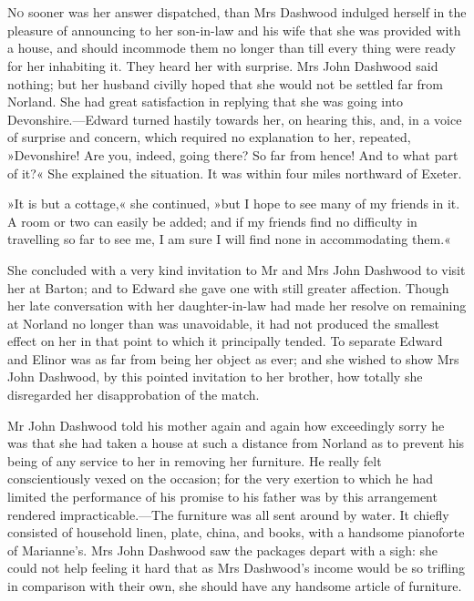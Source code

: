 \chapter[Chapter \thechapter]{}
\lettrine[lines=4,lraise=0.3]{N}{o} sooner was her answer dispatched, than Mrs Dashwood indulged herself in the pleasure of announcing to her son-in-law and his wife that she was provided with a house, and should incommode them no longer than till every thing were ready for her inhabiting it. They heard her with surprise. Mrs John Dashwood said nothing; but her husband civilly hoped that she would not be settled far from Norland. She had great satisfaction in replying that she was going into Devonshire.—Edward turned hastily towards her, on hearing this, and, in a voice of surprise and concern, which required no explanation to her, repeated, »Devonshire! Are you, indeed, going there? So far from hence! And to what part of it?« She explained the situation. It was within four miles northward of Exeter.

»It is but a cottage,« she continued, »but I hope to see many of my friends in it. A room or two can easily be added; and if my friends find no difficulty in travelling so far to see me, I am sure I will find none in accommodating them.«

She concluded with a very kind invitation to Mr and Mrs John Dashwood to visit her at Barton; and to Edward she gave one with still greater affection. Though her late conversation with her daughter-in-law had made her resolve on remaining at Norland no longer than was unavoidable, it had not produced the smallest effect on her in that point to which it principally tended. To separate Edward and Elinor was as far from being her object as ever; and she wished to show Mrs John Dashwood, by this pointed invitation to her brother, how totally she disregarded her disapprobation of the match.

Mr John Dashwood told his mother again and again how exceedingly sorry he was that she had taken a house at such a distance from Norland as to prevent his being of any service to her in removing her furniture. He really felt conscientiously vexed on the occasion; for the very exertion to which he had limited the performance of his promise to his father was by this arrangement rendered impracticable.—The furniture was all sent around by water. It chiefly consisted of household linen, plate, china, and books, with a handsome pianoforte of Marianne’s. Mrs John Dashwood saw the packages depart with a sigh: she could not help feeling it hard that as Mrs Dashwood’s income would be so trifling in comparison with their own, she should have any handsome article of furniture.

